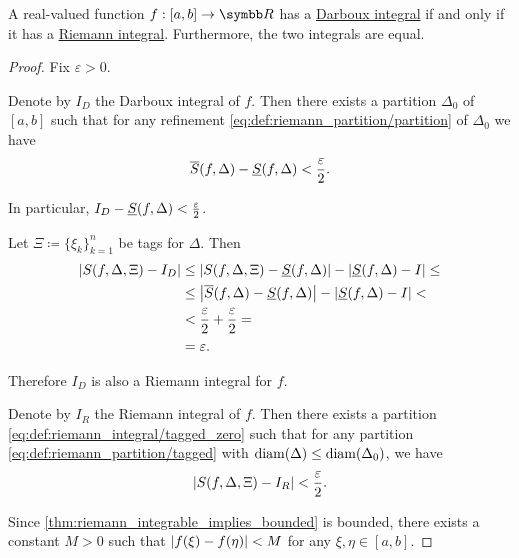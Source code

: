 \begin{proposition}\label{thm:darboux_integral_iff_riemann_integral}
  A real-valued function \( f: [a, b] \to \BR \) has a \hyperref[def:darboux_integral]{Darboux integral} if and only if it has a \hyperref[def:riemann_integral]{Riemann integral}. Furthermore, the two integrals are equal.
\end{proposition}
\begin{proof}
  Fix \( \varepsilon > 0 \).

   Denote by \( I_D \) the Darboux integral of \( f \). Then there exists a partition \( \Delta_0 \) of \( [a, b] \) such that for any refinement \eqref{eq:def:riemann_partition/partition} of \( \Delta_0 \) we have
  \begin{equation*}
    \overline{S}(f, \Delta) - \underline{S}(f, \Delta) < \frac \varepsilon 2.
  \end{equation*}

  In particular, \( I_D - \underline{S}(f, \Delta) < \tfrac \varepsilon 2 \).

  Let \( \Xi \coloneqq \{ \xi_k \}_{k=1}^n \) be tags for \( \Delta \). Then
  \begin{align*}
    \left\vert S(f, \Delta, \Xi) - I_D \right\vert
    &\leq
    \left\vert S(f, \Delta, \Xi) - \underline{S}(f, \Delta) \right\vert - \left\vert \underline{S}(f, \Delta) - I \right\vert
    \leq \\ &\leq
    \left\vert \overline{S}(f, \Delta) - \underline{S}(f, \Delta) \right\vert - \left\vert \underline{S}(f, \Delta) - I \right\vert
    < \\ &<
    \frac \varepsilon 2 + \frac \varepsilon 2
    = \\ &=
    \varepsilon.
  \end{align*}

  Therefore \( I_D \) is also a Riemann integral for \( f \).

   Denote by \( I_R \) the Riemann integral of \( f \). Then there exists a partition \eqref{eq:def:riemann_integral/tagged_zero} such that for any partition \eqref{eq:def:riemann_partition/tagged} with \( \operatorname{diam}(\Delta) \leq \operatorname{diam}(\Delta_0) \), we have
  \begin{equation*}
    \left\vert S(f, \Delta, \Xi) - I_R \right\vert < \frac \varepsilon 2.
  \end{equation*}

  Since \eqref{thm:riemann_integrable_implies_bounded} is bounded, there exists a constant \( M > 0 \) such that \( \left\vert f(\xi) - f(\eta) \right\vert < M \) for any \( \xi, \eta \in [a, b] \).


\end{proof}
